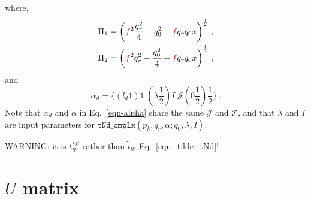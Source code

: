 \documentclass[11pt,aps]{revtex4}
\newcommand{\PF}{{\color{red}f}}
\newcommand{\orig}[1]{{\color{red} #1 }}
\begin{document}
where,
\begin{equation}
\begin{split}
  \Pi_1 &= \left(\PF^2 \frac{q_r^2}{4} + q_0^2 + \PF q_r q_0 x \right)^{\frac{1}{2}} \, ,\\
  \Pi_2 &= \left(\PF^2 q_r^2 + \frac{q_0^2}{4} + \PF q_r q_0 x \right)^{\frac{1}{2}} \, ,
\end{split}
\end{equation}
and
\begin{equation}
  \alpha_d = \{(l_d 1) 1\; (\lambda \frac{1}{2}) I\; \mathcal{J} (0 \frac{1}{2}) \frac{1}{2} \} \, .
\end{equation}
Note that $\alpha_d$ and $\alpha$ in Eq.~\eqref{eqn-alpha} share the same $\mathcal{J}$ and $\mathcal{T}$, and that $\lambda$ and $I$ are input parameters for $\texttt{tNd\_cmplx}(p_k, q_r, \alpha; q_0, \lambda, I)$.

WARNING: it is $t_{ll'}^{sjt}$ rather than $\widetilde{t}_{ll'}$ Eq.~\eqref{eqn_tilde_tNd}!



\section{$U$ matrix}
\end{document}
